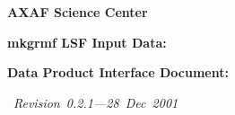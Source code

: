 \documentclass[twoside]{article}
\newcommand{\putdraft}{\special{!userdict begin /bop-hook{gsave 200 30
translate 65 rotate /Times-Roman findfont 216 scalefont setfont 0 0
moveto 0.9 setgray (DRAFT) show grestore}def end}}
\newcommand{\putstring}[6]{
\special{!userdict begin /bop-hook{gsave #1 #2 translate
#3 rotate /Times-Roman findfont #4 scalefont setfont
0 0 moveto #5 setgray (#6) show grestore}def end}
}
\newenvironment{changemargin}[2]{\begin{list}{}{
         \setlength{\topsep}{0pt}\setlength{\leftmargin}{0pt}
         \setlength{\rightmargin}{0pt}
         \setlength{\listparindent}{\parindent}
         \setlength{\itemindent}{\parindent}
         \setlength{\parsep}{0pt plus 1pt}
         \addtolength{\leftmargin}{#1}\addtolength{\rightmargin}{#2}
         }\item }{\end{list}}
\newcommand{\Revision}{\mbox{\em%
Revision 0.2.1---28 Dec 2001 %
}}
\begin{document}


\begin{titlepage}

\begin{changemargin}{-1in}{-1in}

  \begin{center}
    {\huge\bf AXAF Science Center}

    \vspace*{0.1in}
    {\epsfxsize=3.2cm \leavevmode{}}
    \vspace*{0.1in}

    {\LARGE\bf mkgrmf LSF Input Data:}

    \vspace*{0.1in}
    {\LARGE\bf Data Product Interface Document:}
    \vspace*{0.2in}

    \Revision

  \end{center}

  \vfill


\end{changemargin}
\end{titlepage}
\end{document}
